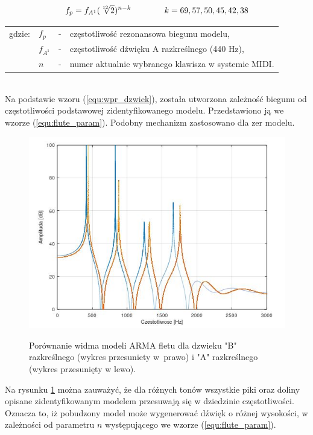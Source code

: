 \begin{equation} \label{equ:flute_param}
\openup\jot
\begin{aligned}[t]
f_{p} = f_{A^{1}}(\sqrt[12]{2})^{n-k} \\ 
\end{aligned}
\qquad\qquad %
\begin{aligned}[t]
k = 69, 57, 50, 45, 42, 38 \\
\end{aligned}
\end{equation}
\begin{tabular}{ l l l l}
	gdzie: & $f_{p}$ &  - & częstotliwość rezonansowa biegunu modelu, \\
	&	$f_{A^{1}}$ & - &  częstotliwość dźwięku A razkreślnego (440 Hz), \\
	&	$n$ & - &  numer aktualnie wybranego klawisza w systemie MIDI.\\
\end{tabular} \\

Na podstawie wzoru (\ref{equ:wpr_dzwiek}), została utworzona zależność biegunu od częstotliwości podstawowej zidentyfikowanego modelu. Przedstawiono ją we wzorze (\ref{equ:flute_param}). Podobny mechanizm zastosowano dla zer modelu. 

\begin{figure}[H]
	\centering
	\includegraphics[width=11.5cm]{grafiki/Model_B_A}
	\label{rys:por_mod_flet}
	\captionsetup{justification=centering}
	\caption{Porównanie widma modeli ARMA fletu dla dzwieku "B" razkreślnego (wykres przesuniety w~prawo) i "A" razkreślnego (wykres przesunięty w lewo).}
	\label{rys:por_mod_flet}
\end{figure}
 Na rysunku \ref{rys:por_mod_flet} można zauważyć, że dla różnych tonów wszystkie piki oraz doliny opisane zidentyfikowanym modelem przesuwają się w dziedzinie częstotliwości. Oznacza to, iż pobudzony model może wygenerować dźwięk o różnej wysokości, w zależności od parametru $n$ występującego we wzorze (\ref{equ:flute_param}).


